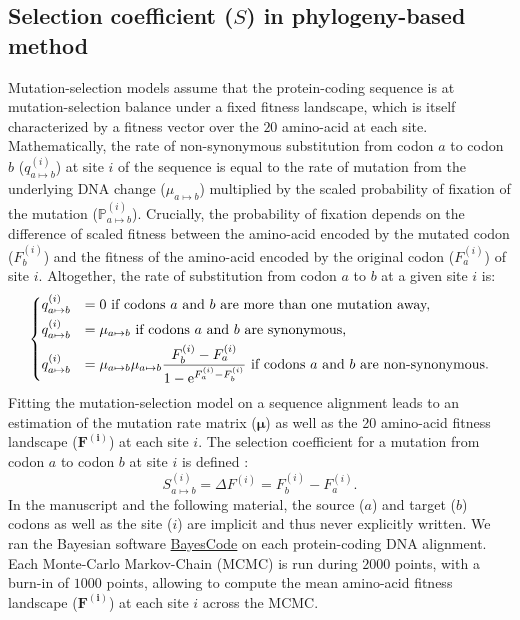 \documentclass{article}
\newcommand{\UniDimArray}[1]{\bm{#1}}
\newcommand{\e}{\mathrm{e}}
\newcommand{\proba}{\mathbb{P}}
\newcommand{\Sphy}{S}
\begin{document}
    \subsection{Selection coefficient ($\Sphy$) in phylogeny-based method}
    \label{subsec:s-phylogeny-method}

    Mutation-selection models assume that the protein-coding sequence is at mutation-selection balance under a fixed fitness landscape, which is itself characterized by a fitness vector over the $20$ amino-acid at each site\cite{yang_mutationselection_2008, halpern_evolutionary_1998, rodrigue_mechanistic_2010}.
    Mathematically, the rate of non-synonymous substitution from codon $a$ to codon $b$ ($q_{a \mapsto b}^{(i)}$) at site $i$ of the sequence is equal to the rate of mutation from the underlying DNA change ($\mu_{a \mapsto b}$) multiplied by the scaled probability of fixation of the mutation ($\proba_{a \mapsto b}^{(i)}$).
    Crucially, the probability of fixation depends on the difference of scaled fitness between the amino-acid encoded by the mutated codon ($F_b^{(i)}$) and the fitness of the amino-acid encoded by the original codon ($F_a^{(i)}$) of site $i$\cite{wright_evolution_1931, fisher_genetical_1930}.
    Altogether, the rate of substitution from codon $a$ to $b$ at a given site $i$ is:
    \begin{equation}
        \begin{dcases}
            q_{a \mapsto b}^{(i)} & = 0 \text{ if codons $a$ and $b$ are more than one mutation away,} \\
            q_{a \mapsto b}^{(i)} & = \mu_{a \mapsto b} \text{ if codons $a$ and $b$ are synonymous,} \\
            q_{a \mapsto b}^{(i)} & = \mu_{a \mapsto b}  \mu_{a \mapsto b} \dfrac{F_b^{(i)} - F_a^{(i)}}{1 - \e^{F_a^{(i)} - F_b^{(i)}}} \text{ if codons $a$ and $b$ are non-synonymous}.
        \end{dcases}
    \end{equation}
    Fitting the mutation-selection model on a sequence alignment leads to an estimation of the mutation rate matrix ($\UniDimArray{\mu}$) as well as the 20 amino-acid fitness landscape ($\UniDimArray{F^{(i)}}$) at each site $i$.
    The selection coefficient for a mutation from codon $a$ to codon $b$ at site $i$ is defined :
    \begin{equation}
        S_{a \mapsto b}^{(i)} = \Delta F^{(i)} = F^{(i)}_{b} - F^{(i)}_{a}.
    \end{equation}
    In the manuscript and the following material, the source ($a$) and target ($b$) codons as well as the site ($i$) are implicit and thus never explicitly written.
    We ran the Bayesian software \href{https://github.com/bayesiancook/bayescode}{BayesCode} on each protein-coding DNA alignment\cite{lartillot_phylobayes_2013, rodrigue_detecting_2017, rodrigue_bayesian_2021}.
    Each Monte-Carlo Markov-Chain (MCMC) is run during $2000$ points, with a burn-in of $1000$ points, allowing to compute the mean amino-acid fitness landscape ($\UniDimArray{F^{(i)}}$) at each site $i$ across the MCMC\@.
\end{document}
